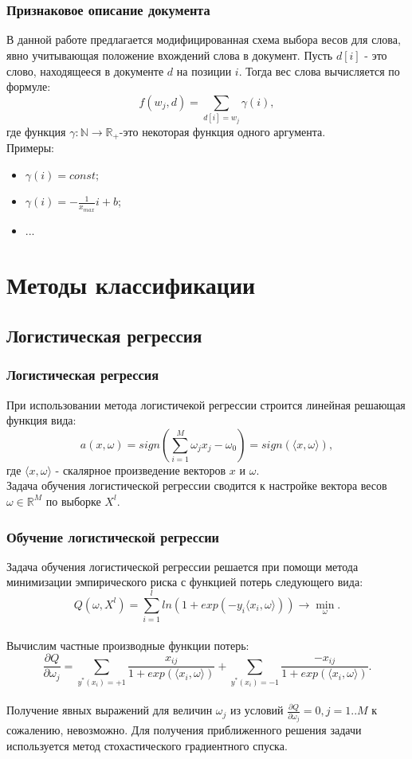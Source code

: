 \documentclass{beamer}
\begin{document}
\section{}
\begin{frame}
\frametitle{Признаковое описание документа}
В данной работе предлагается модифицированная схема выбора весов для слова, явно учитывающая положение вхождений слова в документ. Пусть $d[i]$ - это слово, находящееся в документе $d$ на позиции $i$. Тогда вес слова вычисляется по формуле:
$$f(w_j,d)=\sum\limits_{d[i]=w_j}\gamma(i),$$
где функция $\gamma:\mathbb{N}\rightarrow\mathbb{R}_+$-это некоторая функция одного аргумента.\\
Примеры:
\begin{itemize}
	\item{$\gamma(i)=const;$}
	\item{$\gamma(i)=-\frac{1}{x_{max}}i+b$;}
	\item{...}
\end{itemize}
\end{frame}


\section{Методы классификации}
\subsection{Логистическая регрессия}
\begin{frame}
\end{frame}

\begin{frame}
\frametitle{Логистическая регрессия}
При использовании метода логистичекой регрессии строится линейная решающая функция вида:
$$a(x,\omega)=sign\left(\sum\limits_{i=1}^M\omega_j x_j-\omega_0\right)=sign\left(\langle x,\omega \rangle\right),$$ где $\langle x,\omega \rangle$ - скалярное произведение векторов $x$ и $\omega$.
\newline
\\Задача обучения логистической регрессии сводится к настройке вектора весов $\omega\in \mathbb{R}^M$ по выборке $X^l$.
\end{frame}

\begin{frame}
\frametitle{Обучение логистической регрессии}
Задача обучения логистической регрессии решается при помощи метода минимизации эмпирического риска с функцией потерь следующего вида:
$$Q(\omega, X^l)=\sum\limits_{i=1}^l ln(1+exp(-y_i\langle x_i,\omega \rangle))\rightarrow \min\limits_{\omega}.$$
\\Вычислим частные производные функции потерь:
$$\frac{\partial Q}{\partial \omega_j}=\sum\limits_{y^*(x_i)=+1}\frac{x_{ij}}{1+exp(\langle x_i,\omega\rangle)}+\sum\limits_{y^*(x_i)=-1}\frac{-x_{ij}}{1+exp(\langle x_i,\omega\rangle)}.$$
\\Получение явных выражений для величин $\omega_j$ из условий $\frac{\partial Q}{\partial \omega_j}=0, j=1..M$ к сожалению, невозможно. Для получения приближенного решения задачи используется метод стохастического градиентного спуска.
\end{frame}
\end{document}
